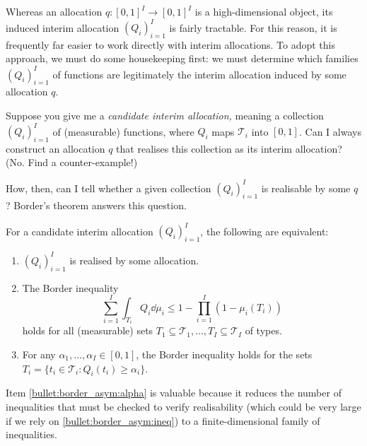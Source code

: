 Whereas an allocation $q : [0,1]^I \to [0,1]^I$ is a high-dimensional object,
its induced interim allocation $(Q_i)_{i=1}^I$ is fairly tractable.
For this reason, it is frequently far easier to work directly with interim allocations.
To adopt this approach, we must do some housekeeping first:
we must determine which families $(Q_i)_{i=1}^I$ of functions
are legitimately the interim allocation induced by some allocation $q$.

Suppose you give me a \emph{candidate interim allocation,}
meaning a collection $(Q_i)_{i=1}^I$ of (measurable) functions, where $Q_i$ maps $\mathcal{T}_i$ into $[0,1]$.
Can I always construct an allocation $q$ that realises this collection as its interim allocation?
(No. Find a counter-example!)

How, then, can I tell whether a given collection $(Q_i)_{i=1}^I$ is realisable by some $q$? Border's theorem answers this question.


\begin{namedthm}
	\label{theorem:border_asym}
	For a candidate interim allocation $(Q_i)_{i=1}^I$,
	the following are equivalent:
	\begin{enumerate}
	
		\item \label{bullet:border_asym:real}
		$(Q_i)_{i=1}^I$ is realised by some allocation.

		\item \label{bullet:border_asym:ineq}
		The Border inequality
		\begin{equation*}
			\sum_{i=1}^I \int_{T_i} Q_i \dd \mu_i
			\leq 1 - \prod_{i=1}^I \left( 1 - \mu_i(T_i) \right)
		\end{equation*}
		holds for all (measurable) sets $T_1 \subseteq \mathcal{T}_1, \dots, T_I \subseteq \mathcal{T}_I$ of types.

		\item \label{bullet:border_asym:alpha}
		For any $\alpha_1,\dots,\alpha_I \in [0,1]$,
		the Border inequality holds for the sets $T_i = \{ t_i \in \mathcal{T}_i : Q_i(t_i) \geq \alpha_i \}$.
	
	\end{enumerate}
\end{namedthm}


Item \ref{bullet:border_asym:alpha} is valuable because it reduces the number of inequalities that must be checked to verify realisability (which could be very large if we rely on \ref{bullet:border_asym:ineq})
to a finite-dimensional family of inequalities.

